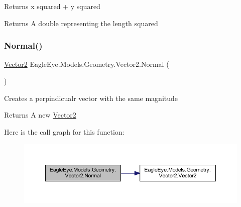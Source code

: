 Returns x squared + y squared 

\begin{DoxyReturn}{Returns}
A double representing the length squared 
\end{DoxyReturn}
\mbox{\label{struct_eagle_eye_1_1_models_1_1_geometry_1_1_vector2_aaf51a15fdc764b60449c16358a1520ee}} 
\subsubsection{\texorpdfstring{Normal()}{Normal()}}
{\footnotesize\ttfamily \mbox{\hyperlink{struct_eagle_eye_1_1_models_1_1_geometry_1_1_vector2}{Vector2}} Eagle\+Eye.\+Models.\+Geometry.\+Vector2.\+Normal (\begin{DoxyParamCaption}{ }\end{DoxyParamCaption})}



Creates a perpindicualr vector with the same magnitude 

\begin{DoxyReturn}{Returns}
A new \mbox{\hyperlink{struct_eagle_eye_1_1_models_1_1_geometry_1_1_vector2}{Vector2}}
\end{DoxyReturn}
Here is the call graph for this function\+:\nopagebreak
\begin{figure}[H]
\begin{center}
\leavevmode
\includegraphics[width=350pt]{struct_eagle_eye_1_1_models_1_1_geometry_1_1_vector2_aaf51a15fdc764b60449c16358a1520ee_cgraph}
\end{center}
\end{figure}
\mbox{\label{struct_eagle_eye_1_1_models_1_1_geometry_1_1_vector2_a7b5b76cccf512fc7bbaae7121f16fa64}} 

